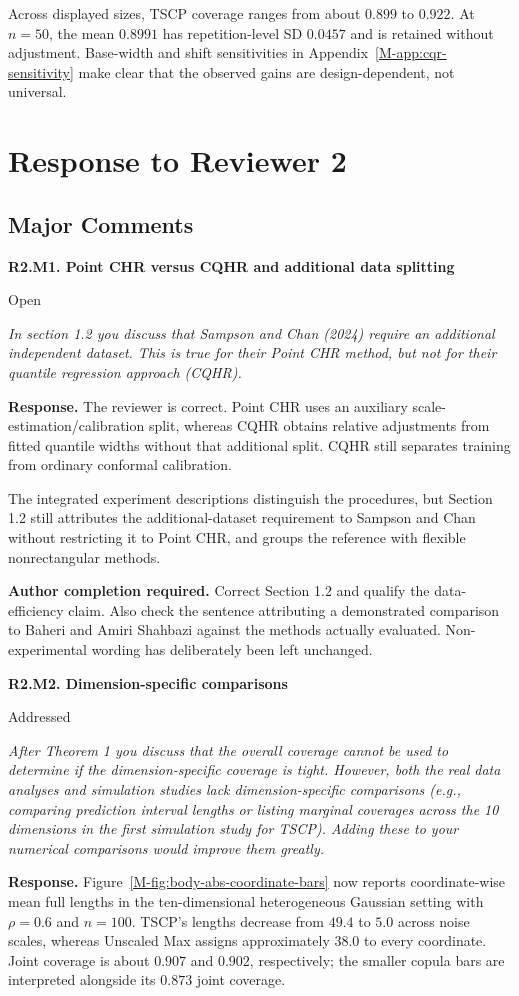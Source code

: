 \documentclass[11pt]{article}
\newcommand{\msapp}[1]{Appendix~\ref*{M-#1}}
\newcommand{\msfig}[1]{Figure~\ref*{M-#1}}
\newcommand{\action}[1]{\par{\small\color{ActionRed}\textbf{Author completion required.} #1\par}}
\newcommand{\point}[3]{\par\Needspace{7\baselineskip}\medskip
\noindent\parbox[t]{0.77\linewidth}{\textbf{#1}}\hfill
\parbox[t]{0.21\linewidth}{\raggedleft\small\sffamily #2}\par\nopagebreak
{\color{ReviewerBlue}\small\itshape #3\par}\textbf{Response.} }
\begin{document}
Across displayed sizes, TSCP coverage ranges from about $0.899$ to $0.922$. At $n=50$, the mean $0.8991$ has repetition-level SD $0.0457$ and is retained without adjustment. Base-width and shift sensitivities in \msapp{app:cqr-sensitivity} make clear that the observed gains are design-dependent, not universal.

\clearpage
\section*{Response to Reviewer 2}
\subsection*{Major Comments}

\point{R2.M1. Point CHR versus CQHR and additional data splitting}{Open}{In section 1.2 you discuss that Sampson and Chan (2024) require an
additional independent dataset. This is true for their Point CHR
method, but not for their quantile regression approach (CQHR).}
\label{response:R2.M1}
The reviewer is correct. Point CHR uses an auxiliary scale-estimation/calibration split, whereas CQHR obtains relative adjustments from fitted quantile widths without that additional split. CQHR still separates training from ordinary conformal calibration.

The integrated experiment descriptions distinguish the procedures, but Section 1.2 still attributes the additional-dataset requirement to Sampson and Chan without restricting it to Point CHR, and groups the reference with flexible nonrectangular methods.

\action{Correct Section 1.2 and qualify the data-efficiency claim. Also check the sentence attributing a demonstrated comparison to Baheri and Amiri Shahbazi against the methods actually evaluated. Non-experimental wording has deliberately been left unchanged.}

\point{R2.M2. Dimension-specific comparisons}{Addressed}{After Theorem 1 you discuss that the overall coverage cannot be used
to determine if the dimension-specific coverage is tight. However,
both the real data analyses and simulation studies lack
dimension-specific comparisons (e.g., comparing prediction interval
lengths or listing marginal coverages across the 10 dimensions in
the first simulation study for TSCP). Adding these to your numerical
comparisons would improve them greatly.}
\label{response:R2.M2}
\msfig{fig:body-abs-coordinate-bars} now reports coordinate-wise mean full lengths in the ten-dimensional heterogeneous Gaussian setting with $\rho=0.6$ and $n=100$. TSCP's lengths decrease from $49.4$ to $5.0$ across noise scales, whereas Unscaled Max assigns approximately $38.0$ to every coordinate. Joint coverage is about $0.907$ and $0.902$, respectively; the smaller copula bars are interpreted alongside its $0.873$ joint coverage.
\end{document}
